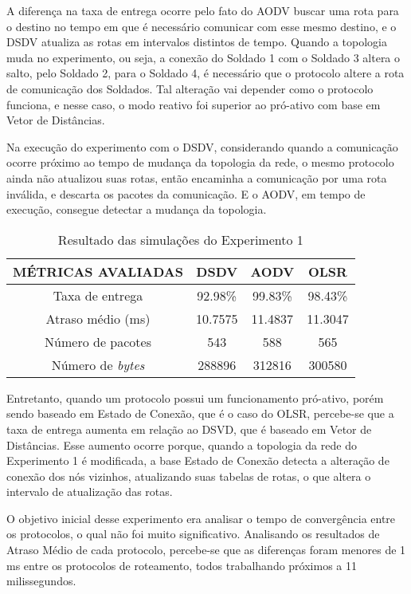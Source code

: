 A diferen\c{c}a na taxa de entrega ocorre pelo fato do AODV buscar uma rota para o destino no tempo em que \'e necess\'ario comunicar com esse mesmo destino, e o DSDV atualiza as rotas em intervalos distintos de tempo.
Quando a topologia muda no experimento, ou seja, a conex\~ao do Soldado 1 com o Soldado 3 altera o salto, pelo Soldado 2, para o Soldado 4, \'e necess\'ario que o protocolo altere a rota de comunica\c{c}\~ao dos Soldados.
Tal altera\c{c}\~ao vai depender como o protocolo funciona, e nesse caso, o modo reativo foi superior ao pr\'o-ativo com base em Vetor de Dist\^ancias.

Na execu\c{c}\~ao do experimento com o DSDV, considerando quando a comunica\c{c}\~ao ocorre pr\'oximo ao tempo de mudan\c{c}a da topologia da rede, o mesmo protocolo ainda n\~ao atualizou suas rotas, ent\~ao encaminha a comunica\c{c}\~ao por uma rota inv\'alida, e descarta os pacotes da comunica\c{c}\~ao. E o AODV, em tempo de execu\c{c}\~ao, consegue detectar a mudan\c{c}a da topologia.

\begin{table}[H]
	\centering
	\caption{Resultado das simula\c{c}\~oes do Experimento 1}
	\begin{tabular}{ | c | c | c | c | }
		\hline
		M\'ETRICAS AVALIADAS & DSDV & AODV & OLSR \\ \hline
		Taxa de entrega & 92.98\% & 99.83\% & 98.43\% \\ \hline
		Atraso m\'edio (ms) & 10.7575 & 11.4837 & 11.3047 \\ \hline
		N\'umero de pacotes & 543 & 588 & 565 \\ \hline
		N\'umero de \textit{bytes} & 288896 & 312816 & 300580 \\ \hline
	\end{tabular}
	\label{tabExp1Result}
\end{table}

Entretanto, quando um protocolo possui um funcionamento pr\'o-ativo, por\'em sendo baseado em Estado de Conex\~ao, que \'e o caso do OLSR, percebe-se que a taxa de entrega aumenta em rela\c{c}\~ao ao DSVD, que \'e baseado em Vetor de Dist\^ancias.
Esse aumento ocorre porque, quando a topologia da rede do Experimento 1 \'e modificada, a base Estado de Conex\~ao detecta a altera\c{c}\~ao de conex\~ao dos n\'os vizinhos, atualizando suas tabelas de rotas, o que altera o intervalo de atualiza\c{c}\~ao das rotas.

O objetivo inicial desse experimento era analisar o tempo de converg\^encia entre os protocolos, o qual n\~ao foi muito significativo.
Analisando os resultados de Atraso M\'edio de cada protocolo, percebe-se que as diferen\c{c}as foram menores de 1 ms entre os protocolos de roteamento, todos trabalhando pr\'oximos a 11 milissegundos.

